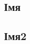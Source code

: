 \documentclass[]{lib/styles/default-style}
\begin{document}
\chapter{}
\section{Імя}
\section{Імя2}
\end{document}
